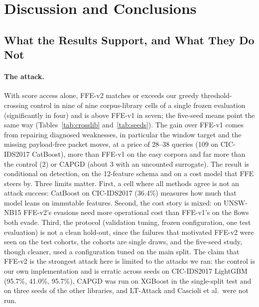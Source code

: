 \section{Discussion and Conclusions}
\label{sec:conclusion}

\subsection{What the Results Support, and What They Do Not}
\label{sec:discussion}

\paragraph{The attack.} With score access alone, FFE-v2 matches or exceeds our greedy threshold-crossing control in nine of nine corpus-library cells of a single frozen evaluation (significantly in four) and is above FFE-v1 in seven; the five-seed means point the same way (Tables~\ref{tab:crosslib} and~\ref{tab:seeds}). The gain over FFE-v1 comes from repairing diagnosed weaknesses, in particular the window target and the missing payload-free packet moves, at a price of 28--38 queries (109 on CIC-IDS2017 CatBoost), more than FFE-v1 on the easy corpora and far more than the control (2) or CAPGD (about 3 with an uncounted surrogate). The result is conditional on detection, on the 12-feature schema and on a cost model that FFE steers by. Three limits matter. First, a cell where all methods agree is not an attack success: CatBoost on CIC-IDS2017 (36.4\%) measures how much that model leans on immutable features. Second, the cost story is mixed: on UNSW-NB15 FFE-v2's evasions need more operational cost than FFE-v1's on the flows both evade. Third, the protocol (validation tuning, frozen configuration, one test evaluation) is not a clean hold-out, since the failures that motivated FFE-v2 were seen on the test cohorts, the cohorts are single draws, and the five-seed study, though cleaner, used a configuration tuned on the main split. The claim that FFE-v2 is the strongest attack here is limited to the attacks we ran: the control is our own implementation and is erratic across seeds on CIC-IDS2017 LightGBM (95.7\%, 41.0\%, 95.7\%), CAPGD was run on XGBoost in the single-split test and on three seeds of the other libraries, and LT-Attack and Cascioli et al.\ were not run.

